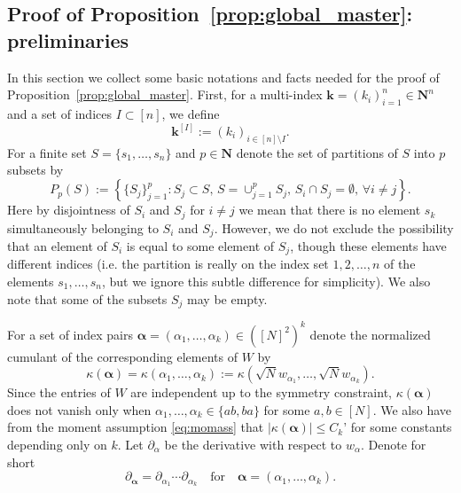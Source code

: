 \documentclass[10pt]{amsart}
\numberwithin{equation}{section}
\newcommand{\N}{\mathbf{N}}
\begin{document}
\subsection{Proof of Proposition~\ref{prop:global_master}: preliminaries}\label{sec:Psi_preliminaries}

In this section we collect some basic notations and facts needed for the proof of Proposition~\ref{prop:global_master}. First, for a multi-index $\bm{k}=(k_i)_{i=1}^n\in\N^n$ and a set of indices $I\subset [n]$, we define
\begin{equation}
\bm{k}^{[I]}:=(k_i)_{i\in [n]\setminus I}.
\end{equation}
For a finite set $S=\{s_1,\ldots,s_n\}$ and $p\in\N$ denote the set of partitions of $S$ into $p$ subsets by
\begin{equation}
P_p(S):= \left\lbrace \{S_j\}_{j=1}^p: S_j\subset S,\, S=\cup_{j=1}^p S_j,\, S_i\cap S_j=\emptyset,\,\forall i\neq j\right\rbrace.
\end{equation}
Here by disjointness of $S_i$ and $S_j$ for $i\neq j$ we mean that there is no element $s_k$ simultaneously belonging to $S_i$ and $S_j$. However, we do not exclude the possibility that an element of $S_i$ is equal to some element of $S_j$, though these elements have different indices (i.e. the partition is really on the index set $1, 2,\ldots, n$ of the elements $s_1, \ldots, s_n$, but we ignore this subtle difference for simplicity). We also note that some of the subsets $S_j$ may be empty. 

For a set of index pairs $\bm{\alpha}=(\alpha_1,\ldots,\alpha_k)\in([N]^2)^k$ denote the normalized cumulant of the corresponding elements of $W$ by
\begin{equation*}
\kappa(\bm{\alpha})=\kappa(\alpha_1,\ldots,\alpha_k):=\kappa(\sqrt{N}w_{\alpha_1},\ldots,\sqrt{N}w_{\alpha_k}).
\end{equation*}
Since the entries of $W$ are independent up to the symmetry constraint, $\kappa(\bm{\alpha})$ does not vanish only when $\alpha_1,\ldots,\alpha_k\in\{ab,ba\}$ for some $a,b\in[N]$. We also have from the moment assumption \eqref{eq:momass} that $|\kappa(\bm{\alpha})|\le C_k’$ for some constants depending only on $k$. Let $\partial_{\alpha}$ be the derivative with respect to $w_{\alpha}$. Denote for short 
\begin{equation*}
\partial_{\bm{\alpha}}=\partial_{\alpha_1}\cdots \partial_{\alpha_k}\quad \text{for}\quad \bm{\alpha}=(\alpha_1,\ldots,\alpha_k).
\end{equation*}
\end{document}
